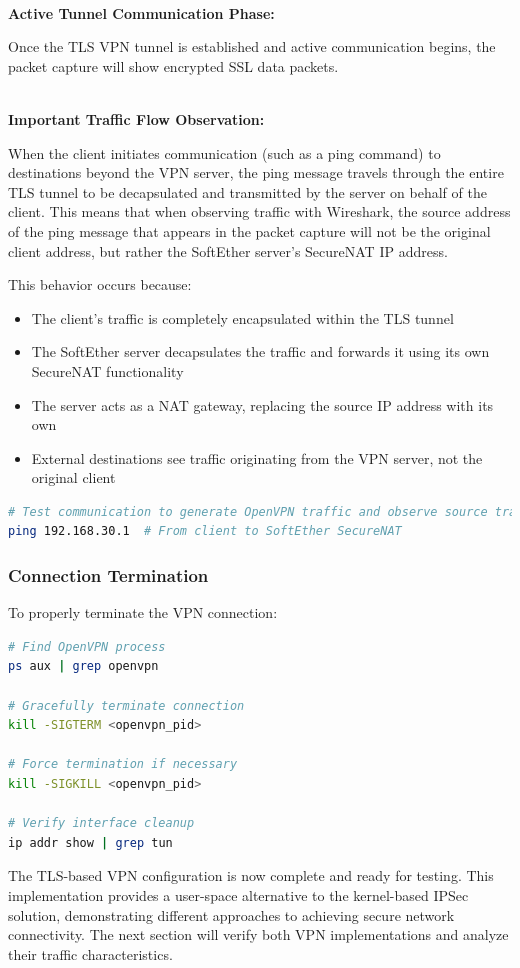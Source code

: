 \noindent
\\
\textbf{Active Tunnel Communication Phase:}

\noindent
Once the TLS VPN tunnel is established and active communication begins, the packet capture will show encrypted SSL data packets. 

\noindent
\\
\textbf{Important Traffic Flow Observation:}

\noindent
When the client initiates communication (such as a ping command) to destinations beyond the VPN server, the ping message travels through the entire TLS tunnel to be decapsulated and transmitted by the server on behalf of the client. This means that when observing traffic with Wireshark, the source address of the ping message that appears in the packet capture will not be the original client address, but rather the SoftEther server's SecureNAT IP address.

\noindent
This behavior occurs because:
\begin{itemize}
    \item The client's traffic is completely encapsulated within the TLS tunnel
    \item The SoftEther server decapsulates the traffic and forwards it using its own SecureNAT functionality
    \item The server acts as a NAT gateway, replacing the source IP address with its own
    \item External destinations see traffic originating from the VPN server, not the original client
\end{itemize}

\begin{lstlisting}[language=bash]
# Test communication to generate OpenVPN traffic and observe source translation
ping 192.168.30.1  # From client to SoftEther SecureNAT
\end{lstlisting}


\subsubsection{Connection Termination}

To properly terminate the VPN connection:

\begin{lstlisting}[language=bash]
# Find OpenVPN process
ps aux | grep openvpn

# Gracefully terminate connection
kill -SIGTERM <openvpn_pid>

# Force termination if necessary
kill -SIGKILL <openvpn_pid>

# Verify interface cleanup
ip addr show | grep tun
\end{lstlisting}

\noindent
The TLS-based VPN configuration is now complete and ready for testing. This implementation provides a user-space alternative to the kernel-based IPSec solution, demonstrating different approaches to achieving secure network connectivity. The next section will verify both VPN implementations and analyze their traffic characteristics.

